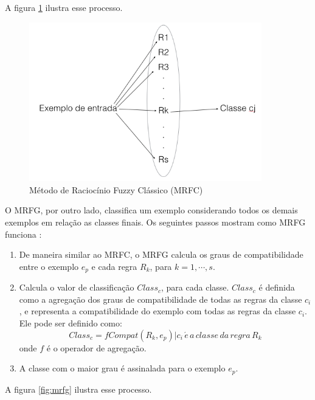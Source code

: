 \documentclass[template.tex]{subfiles}
\begin{document}
A figura \ref{fig:mrfc} ilustra esse processo.

\begin{figure}[H]  
  \caption{Método de Raciocínio Fuzzy Clássico (MRFC)}
  \label{fig:mrfc}
  \centering
    \includegraphics[width=0.9\textwidth]{mrfc}
\end{figure}

O MRFG, por outro lado, classifica um exemplo considerando todos os demais exemplos em relação as classes finais. Os seguintes passos mostram como MRFG funciona \cite{cintra2012genetic}:

\begin{enumerate}
\item De maneira similar ao MRFC, o MRFG calcula os graus de compatibilidade entre o exemplo $e_p$ e cada regra $R_k$, para $k = 1, \cdots, s$.
\item Calcula o valor de classificação $Class_c$, para cada classe. $Class_c$ é definida como a agregação dos graus de compatibilidade de todas as regras da classe $c_i$, e representa a compatibilidade do exemplo com todas as regras da classe $c_i$. Ele pode ser definido como:
\begin{equation}
Class_c = f{Compat(R_k, e_p)|c_i \, \acute{e}\, a\, classe\, da\, regra\, R_k}
\end{equation}
onde $f$ é o operador de agregação.
\item A classe com o maior grau é assinalada para o exemplo $e_p$.
\end{enumerate}

A figura \ref{fig:mrfg} ilustra esse processo.
\end{document}
